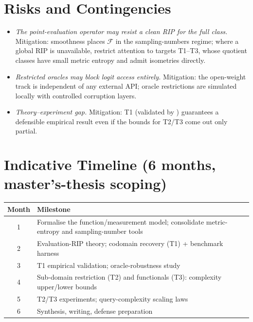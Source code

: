 \documentclass[11pt,a4paper]{article}
\theoremstyle{definition}
\newcommand{\Fclass}{\mathcal{F}}
\begin{document}
\section{Risks and Contingencies}

\begin{itemize}[leftmargin=*]
  \item \emph{The point-evaluation operator may resist a clean RIP for the full
  class.} Mitigation: smoothness places $\Fclass$ in the sampling-numbers regime;
  where a global RIP is unavailable, restrict attention to targets T1--T3, whose
  quotient classes have small metric entropy and admit isometries directly.
  \item \emph{Restricted oracles may block logit access entirely.} Mitigation: the
  open-weight track is independent of any external API; oracle restrictions are
  simulated locally with controlled corruption layers.
  \item \emph{Theory--experiment gap.} Mitigation: T1 (validated by
  \citet{carlini2024stealing}) guarantees a defensible empirical result even if
  the bounds for T2/T3 come out only partial.
\end{itemize}

\section{Indicative Timeline (6 months, master's-thesis scoping)}

\begin{center}
\begin{tabular}{cl}
\toprule
\textbf{Month} & \textbf{Milestone}\\
\midrule
1 & Formalise the function/measurement model; consolidate metric-entropy and sampling-number tools\\
2 & Evaluation-RIP theory; codomain recovery (T1) + benchmark harness\\
3 & T1 empirical validation; oracle-robustness study\\
4 & Sub-domain restriction (T2) and functionals (T3): complexity upper/lower bounds\\
5 & T2/T3 experiments; query-complexity scaling laws\\
6 & Synthesis, writing, defense preparation\\
\bottomrule
\end{tabular}
\end{center}
\end{document}

